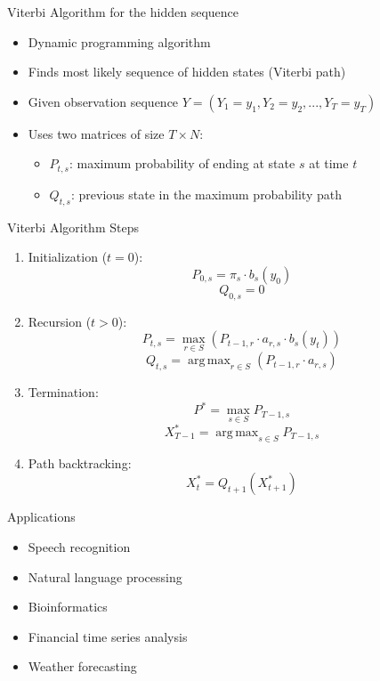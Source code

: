 \documentclass{beamer}
\DeclareMathOperator*{\argmax}{arg\,max}
\begin{document}
\begin{frame}{Viterbi Algorithm for the hidden sequence}
    \begin{itemize}
        \item Dynamic programming algorithm
        \item Finds most likely sequence of hidden states (Viterbi path)
        \item Given observation sequence $Y = (Y_1=y_1, Y_2=y_2, ..., Y_T=y_T)$
        \item Uses two matrices of size $T \times N$:
        \begin{itemize}
            \item $P_{t,s}$: maximum probability of ending at state $s$ at time $t$
            \item $Q_{t,s}$: previous state in the maximum probability path
        \end{itemize}
    \end{itemize}
\end{frame}

\begin{frame}{Viterbi Algorithm Steps}
    \begin{enumerate}
        \item Initialization ($t=0$):
        \[P_{0,s} = \pi_s \cdot b_s(y_0)\]
        \[Q_{0,s} = 0\]
        
        \item Recursion ($t>0$):
        \[P_{t,s} = \max_{r \in S} (P_{t-1,r} \cdot a_{r,s} \cdot b_s(y_t))\]
        \[Q_{t,s} = \argmax_{r \in S} (P_{t-1,r} \cdot a_{r,s})\]
        
        \item Termination:
        \[P^* = \max_{s \in S} P_{T-1,s}\]
        \[X_{T-1}^* = \argmax_{s \in S} P_{T-1,s}\]
        
        \item Path backtracking:
        \[X_t^* = Q_{t+1}(X_{t+1}^*)\]
    \end{enumerate}
\end{frame}
\begin{frame}{Applications}
    \begin{itemize}
        \item Speech recognition
        \item Natural language processing
        \item Bioinformatics
        \item Financial time series analysis
        \item Weather forecasting
    \end{itemize}
\end{frame}
\end{document}
